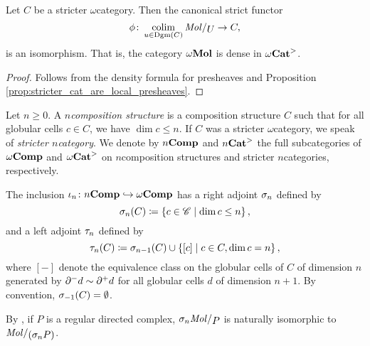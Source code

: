 \begin{cor} \label{cor:diagrams_are_dense} 
    Let \( C \) be a stricter \( \omega \)\nbd category.
    Then the canonical strict functor
    \begin{equation*}
        \phi \colon \colim_{u \in \Dgm(C)} \molecin{U} \to C,
    \end{equation*}
    is an isomorphism.
    That is, the category \( \omega\mathbf{Mol} \) is dense in \( {\omega\mathbf{Cat}}^> \).
\end{cor}
\begin{proof}
    Follows from the density formula for presheaves and Proposition \ref{prop:stricter_cat_are_local_presheaves}.
\end{proof}

\begin{dfn} 
    Let \( n \geq 0 \).
    A \emph{\( n \)\nbd composition structure} is a composition structure \( C \) such that for all globular cells \( c \in C \), we have \( \dim c \le n \).
    If \( C \) was a stricter \( \omega \)\nbd category, we speak of \emph{stricter \( n \)\nbd category}.
    We denote by \( {n\mathbf{Comp}} \) and \( {n\mathbf{Cat}}^> \) the full subcategories of \( \omega\mathbf{Comp} \) and \( {\omega\mathbf{Cat}}^> \) on \( n \)\nbd composition structures and stricter \( n \)\nbd categories, respectively. 
\end{dfn}

\begin{dfn} 
    The inclusion \( \iota_n \colon {n\mathbf{Comp}} \hookrightarrow \omega\mathbf{Comp} \) has a right adjoint \( \sigma_{n} \) defined by
    \begin{equation*}
        \sigma_{n}(C) \coloneqq \left\{ {c \in \mathscr{C} \mid \dim c \le n} \right\},
    \end{equation*}
    and a left adjoint \( \tau_{n} \) defined by
    \begin{equation*}
        \tau_{n}(C) \coloneqq \sigma_{n - 1}(C) \cup \left\{ {[c] \mid c \in C, \dim c = n} \right\},
    \end{equation*}
    where \( [-] \) denote the equivalence class on the globular cells of \( C \) of dimension \( n \) generated by \( \partial_{}^{-} d \sim \partial_{}^{+} d \) for all globular cells \( d \) of dimension \( n + 1 \). 
    By convention, \( \sigma_{-1}(C) = \emptyset \).
\end{dfn}

\begin{rmk}
    By \cite[Proposition 5.2.14]{hadzihasanovic2024combinatorics}, if \( P \) is a regular directed complex, \( \skel{n} \molecin{P} \) is naturally isomorphic to \( \molecin{(\skel{n}P)} \).
\end{rmk}

